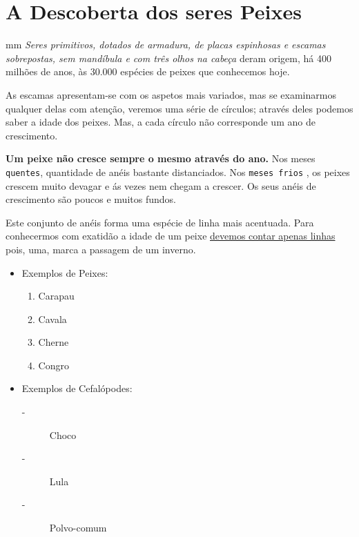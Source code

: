 \documentclass[a4paper, 11pt]{article}
\begin{document}
	\section{A Descoberta dos seres Peixes}
		{ mm }
		\textit{Seres primitivos, dotados de armadura, de placas espinhosas e escamas sobrepostas,
		sem mandíbula e com três olhos na cabeça}
		deram origem, há
		{\LARGE 400 milhões}
		de anos, às 30.000 espécies de peixes que conhecemos hoje.

		\vspace{0.5cm}
		{\huge {}} 
		\vspace{0.5cm}


		{\hskip 3mm} As escamas apresentam-se com os aspetos mais variados, mas se examinarmos
		qualquer delas com atenção, veremos uma série de círculos; através deles podemos saber a
		idade dos peixes. Mas, a cada círculo não corresponde um ano de crescimento.

		\textbf {Um peixe não cresce sempre o mesmo através do ano.} Nos meses
		{\tt quentes}, quantidade de anéis bastante distanciados. Nos
		{\tt meses frios} , os peixes crescem muito devagar e ás vezes nem chegam a crescer.
		Os seus anéis de crescimento são poucos e muitos fundos.

		Este conjunto de anéis forma uma espécie de linha mais acentuada. Para
		conhecermos com exatidão a idade de um peixe 
		\underline{devemos contar apenas linhas} 
		pois, uma, marca a passagem de um {\huge inverno}.
		\vskip -0.5cm
		\begin{itemize}
			\item Exemplos de Peixes:
				\begin{enumerate}
					\item Carapau
					\item Cavala
					\item Cherne
					\item Congro
				\end{enumerate}
			\item Exemplos de Cefalópodes:
				\begin{description}
					\item[-] Choco
					\item[-] Lula
					\item[-] Polvo-comum
				\end{description}
		\end{itemize}
\end{document}
